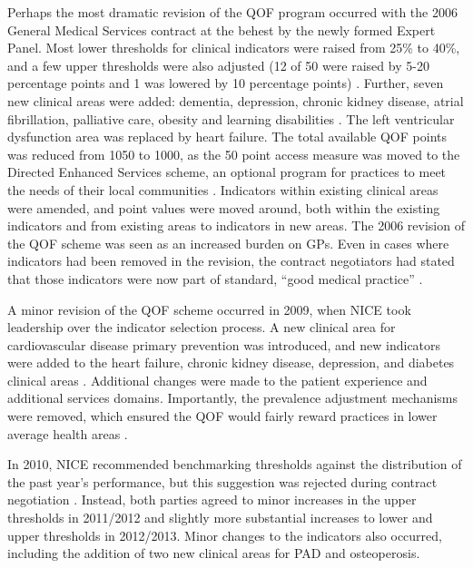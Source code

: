 \documentclass[12pt]{article}
\begin{document}
Perhaps the most dramatic revision of the QOF program occurred with the 2006 General Medical Services contract at the behest by the newly formed Expert Panel. Most lower thresholds for clinical indicators were raised from 25\% to 40\%, and a few upper thresholds were also adjusted (12 of 50 were raised by 5-20 percentage points and 1 was lowered by 10 percentage points) \citep{doranSettingPerformanceTargets2014}. Further, seven new clinical areas were added: dementia, depression, chronic kidney disease, atrial fibrillation, palliative care, obesity and learning disabilities \citep{applebeeUnderstandingRevisedQOF2006}. The left ventricular dysfunction area was replaced by heart failure. The total available QOF points was reduced from 1050 to 1000, as the 50 point access measure was moved to the Directed Enhanced Services scheme, an optional program for practices to meet the needs of their local communities \citep{nationalhealthserviceNHSEmployersDirected2006}. Indicators within existing clinical areas were amended, and point values were moved around, both within the existing indicators and from existing areas to indicators in new areas. The 2006 revision of the QOF scheme was seen as an increased burden on GPs. Even in cases where indicators had been removed in the revision, the contract negotiators had stated that those indicators were now part of standard, ``good medical practice'' \citep{applebeeUnderstandingRevisedQOF2006}.

A minor revision of the QOF scheme occurred in 2009, when NICE took leadership over the indicator selection process. A new clinical area for cardiovascular disease primary prevention was introduced, and new indicators were added to the heart failure, chronic kidney disease, depression, and diabetes clinical areas \citep{nationalhealthserviceQualityOutcomesFramework2010}. Additional changes were made to the patient experience and additional services domains. Importantly, the prevalence adjustment mechanisms were removed, which ensured the QOF would fairly reward practices in lower average health areas \citep{dixonQualityOutcomesFramework2011}.

In 2010, NICE recommended benchmarking thresholds against the distribution of the past year's performance, but this suggestion was rejected during contract negotiation \citep{doranSettingPerformanceTargets2014}. Instead, both parties agreed to minor increases in the upper thresholds in 2011/2012 and slightly more substantial increases to lower and upper thresholds in 2012/2013. Minor changes to the indicators also occurred, including the addition of two new clinical areas for PAD and osteoperosis.
\end{document}
